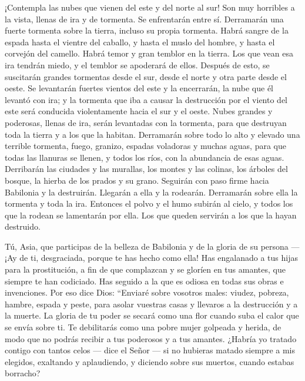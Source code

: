  ¡Contempla las nubes que vienen del este y del norte al
sur! Son muy horribles a la vista, llenas de ira y de tormenta.
 Se enfrentarán entre sí. Derramarán una fuerte tormenta
sobre la tierra, incluso su propia tormenta. Habrá sangre de la espada
hasta el vientre del caballo,  y hasta el muslo del
hombre, y hasta el corvejón del camello.  Habrá temor y
gran temblor en la tierra. Los que vean esa ira tendrán miedo, y el
temblor se apoderará de ellos.  Después de esto, se
suscitarán grandes tormentas desde el sur, desde el norte y otra parte
desde el oeste.  Se levantarán fuertes vientos del este y
la encerrarán, la nube que él levantó con ira; y la tormenta que iba a
causar la destrucción por el viento del este será conducida
violentamente hacia el sur y el oeste.  Nubes grandes y
poderosas, llenas de ira, serán levantadas con la tormenta, para que
destruyan toda la tierra y a los que la habitan. Derramarán sobre todo
lo alto y elevado una terrible tormenta,  fuego, granizo,
espadas voladoras y muchas aguas, para que todas las llanuras se llenen,
y todos los ríos, con la abundancia de esas aguas. 
Derribarán las ciudades y las murallas, los montes y las colinas, los
árboles del bosque, la hierba de los prados y su grano. 
Seguirán con paso firme hacia Babilonia y la destruirán. 
Llegarán a ella y la rodearán. Derramarán sobre ella la tormenta y toda
la ira. Entonces el polvo y el humo subirán al cielo, y todos los que la
rodean se lamentarán por ella.  Los que queden servirán a
los que la hayan destruido.

 Tú, Asia, que participas de la belleza de Babilonia y de
la gloria de su persona ---  ¡Ay de ti, desgraciada,
porque te has hecho como ella! Has engalanado a tus hijas para la
prostitución, a fin de que complazcan y se gloríen en tus amantes, que
siempre te han codiciado.  Has seguido a la que es odiosa
en todas sus obras e invenciones. Por eso dice Dios: 
``Enviaré sobre vosotros males: viudez, pobreza, hambre, espada y peste,
para asolar vuestras casas y llevaros a la destrucción y a la muerte.
 La gloria de tu poder se secará como una flor cuando
suba el calor que se envía sobre ti.  Te debilitarás como
una pobre mujer golpeada y herida, de modo que no podrás recibir a tus
poderosos y a tus amantes.  ¿Habría yo tratado contigo
con tantos celos --- dice el Señor ---  si no hubieras
matado siempre a mis elegidos, exaltando y aplaudiendo, y diciendo sobre
sus muertos, cuando estabas borracho?

